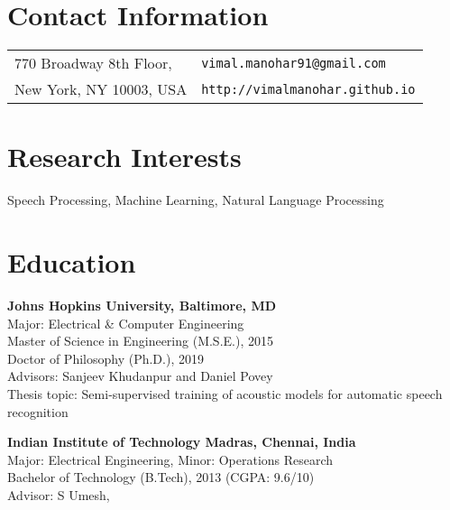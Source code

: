 \documentclass[margin,line,pifont,palatino,courier]{res}
\begin{document}

\begin{resume}

\section{\sc Contact Information}

\vspace{.05in}
\begin{tabular}{l l}
770 Broadway 8th Floor,              & \verb+vimal.manohar91@gmail.com+\\
New York, NY 10003, USA                 & \verb+http://vimalmanohar.github.io+\\
\end{tabular}

\section{\sc Research Interests}
Speech Processing, Machine Learning, Natural Language Processing

\section{\sc Education}

\textbf{Johns Hopkins University, Baltimore, MD} \\
Major: Electrical \& Computer Engineering \\
Master of Science in Engineering (M.S.E.), 2015\\
Doctor of Philosophy (Ph.D.), 2019 \\
Advisors: Sanjeev Khudanpur and Daniel Povey \\
Thesis topic: Semi-supervised training of acoustic models for automatic speech recognition

\textbf{Indian Institute of Technology Madras, Chennai, India} \\
Major: Electrical Engineering, \quad Minor: Operations Research \\
Bachelor of Technology (B.Tech), 2013 (CGPA: 9.6/10) \\
Advisor: S Umesh, \\

\vspace{-2pt}


\end{resume}
\end{document}
